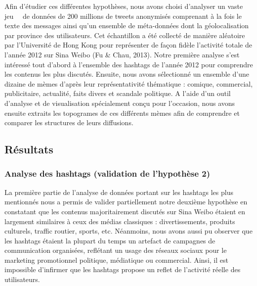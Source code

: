 Afin d{\textquoteright}\'etudier ces diff\'erentes hypoth\`eses, nous avons choisi d{\textquoteright}analyser un vaste jeu \ \ de donn\'ees de 200 millions de tweets anonymis\'es comprenant \`a la fois le texte des messages ainsi qu{\textquoteright}un ensemble de m\'eta-donn\'ees dont la g\'eolocalisation par province des utilisateurs. Cet \'echantillon a \'et\'e collect\'e de mani\`ere al\'eatoire par l{\textquoteright}Universit\'e de Hong Kong pour repr\'esenter de fa\c{c}on fid\`ele l{\textquoteright}activit\'e totale de l{\textquoteright}ann\'ee 2012 sur Sina Weibo (Fu \& Chau, 2013). Notre premi\`ere analyse s{\textquoteright}est int\'eress\'e tout d{\textquoteright}abord \`a l{\textquoteright}ensemble des hashtags de l{\textquoteright}ann\'ee 2012 pour comprendre les contenus les plus discut\'es. Ensuite, nous avons s\'electionn\'e un ensemble d{\textquoteright}une dizaine de m\`emes d{\textquoteright}apr\`es leur repr\'esentativit\'e th\'ematique : comique, commercial, publicitaire, actualit\'e, faits divers et scandale politique. A l{\textquoteright}aide d{\textquoteright}un outil d{\textquoteright}analyse et de visualisation sp\'ecialement con\c{c}u pour l{\textquoteright}occasion, nous avons ensuite extraits les topogrames de ces diff\'erents m\`emes afin de comprendre et comparer les structures de leurs diffusions.

\subsection{R\'esultats} 
\subsubsection{Analyse des hashtags (validation de l{\textquoteright}hypoth\`ese 2)} 

La premi\`ere partie de l{\textquoteright}analyse de donn\'ees portant sur les hashtags les plus mentionn\'es nous a permis de valider partiellement notre deuxi\`eme hypoth\`ese en constatant que les contenus majoritairement discut\'es sur Sina Weibo \'etaient en largement similaires \`a ceux des m\'edias classiques : divertissements, produits culturels, traffic routier, sports, etc. N\'eanmoins, nous avons aussi pu observer que les hashtags \'etaient la plupart du temps un artefact de campagnes de communication organis\'ees, refl\'etant un usage des r\'eseaux sociaux pour le marketing promotionnel politique, m\'ediatique ou commercial. Ainsi, il est impossible d{\textquoteright}infirmer que les hashtags propose un reflet de l{\textquoteright}activit\'e r\'eelle des utilisateurs.

